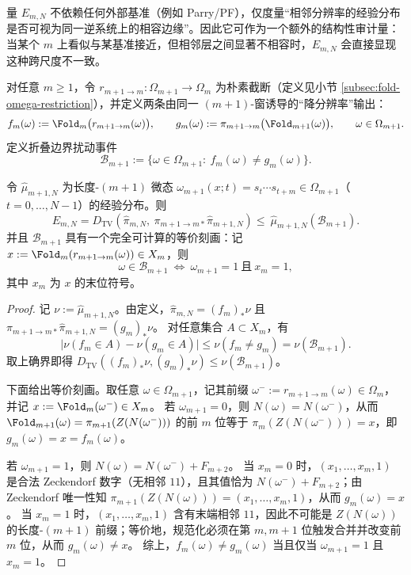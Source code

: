 \begin{remark}[语义与可判读性]
量 \(E_{m,N}\) 不依赖任何外部基准（例如 Parry/PF），仅度量“相邻分辨率的经验分布是否可视为同一逆系统上的相容边缘”。因此它可作为一个额外的结构性审计量：当某个 \(m\) 上看似与某基准接近，但相邻层之间显著不相容时，\(E_{m,N}\) 会直接显现这种跨尺度不一致。
\end{remark}

\begin{definition}[折叠边界扰动事件]\label{def:fold-boundary-event}
对任意 $m\ge 1$，令 $r_{m+1\to m}:\Omega_{m+1}\to\Omega_m$ 为朴素截断（定义见小节 \ref{subsec:fold-omega-restriction}），并定义两条由同一 $(m{+}1)$-窗诱导的“降分辨率”输出：
\[
f_m(\omega):=\Fold_m\bigl(r_{m+1\to m}(\omega)\bigr),\qquad
g_m(\omega):=\pi_{m+1\to m}\bigl(\Fold_{m+1}(\omega)\bigr),\qquad \omega\in\Omega_{m+1}.
\]
定义折叠边界扰动事件
\[
\mathcal{B}_{m+1}:=\{\omega\in\Omega_{m+1}:\ f_m(\omega)\ne g_m(\omega)\}.
\]
\end{definition}

\begin{proposition}\label{prop:multiscale-residual-by-boundary}
令 $\hat\mu_{m+1,N}$ 为长度-$(m{+}1)$ 微态 $\omega_{m+1}(x;t)=s_t\cdots s_{t+m}\in\Omega_{m+1}$（$t=0,\dots,N-1$）的经验分布。则
\[
E_{m,N}
=D_{\mathrm{TV}}\!\left(\hat\pi_{m,N},\ \pi_{m+1\to m*}\hat\pi_{m+1,N}\right)
\le\ \hat\mu_{m+1,N}(\mathcal{B}_{m+1}).
\]
并且 $\mathcal{B}_{m+1}$ 具有一个完全可计算的等价刻画：记 $x:=\Fold_m(r_{m+1\to m}(\omega))\in X_m$，则
\[
\omega\in\mathcal{B}_{m+1}\ \Longleftrightarrow\ \omega_{m+1}=1\ \text{且}\ x_m=1,
\]
其中 $x_m$ 为 $x$ 的末位符号。
\end{proposition}

\begin{proof}
记 $\nu:=\hat\mu_{m+1,N}$。由定义，$\hat\pi_{m,N}=(f_m)_*\nu$ 且 $\pi_{m+1\to m*}\hat\pi_{m+1,N}=(g_m)_*\nu$。
对任意集合 $A\subset X_m$，有
\[
\bigl|\nu(f_m\in A)-\nu(g_m\in A)\bigr|\le \nu(f_m\ne g_m)=\nu(\mathcal{B}_{m+1}).
\]
取上确界即得 $D_{\mathrm{TV}}((f_m)_*\nu,(g_m)_*\nu)\le \nu(\mathcal{B}_{m+1})$。

下面给出等价刻画。取任意 $\omega\in\Omega_{m+1}$，记其前缀 $\omega^-:=r_{m+1\to m}(\omega)\in\Omega_m$，并记 $x:=\Fold_m(\omega^-)\in X_m$。
若 $\omega_{m+1}=0$，则 $N(\omega)=N(\omega^-)$，从而
\(
\Fold_{m+1}(\omega)=\pi_{m+1}(Z(N(\omega^-)))
\)
的前 $m$ 位等于 $\pi_m(Z(N(\omega^-)))=x$，即 $g_m(\omega)=x=f_m(\omega)$。

若 $\omega_{m+1}=1$，则 $N(\omega)=N(\omega^-)+F_{m+2}$。
当 $x_m=0$ 时，$(x_1,\dots,x_m,1)$ 是合法 Zeckendorf 数字（无相邻 $11$），且其值恰为 $N(\omega^-)+F_{m+2}$；由 Zeckendorf 唯一性知
\(
\pi_{m+1}(Z(N(\omega)))=(x_1,\dots,x_m,1)
\)，从而 $g_m(\omega)=x$。
当 $x_m=1$ 时，$(x_1,\dots,x_m,1)$ 含有末端相邻 $11$，因此不可能是 $Z(N(\omega))$ 的长度-$(m{+}1)$ 前缀；等价地，规范化必须在第 $m,m{+}1$ 位触发合并并改变前 $m$ 位，从而 $g_m(\omega)\ne x$。
综上，$f_m(\omega)\ne g_m(\omega)$ 当且仅当 $\omega_{m+1}=1$ 且 $x_m=1$。
\end{proof}

